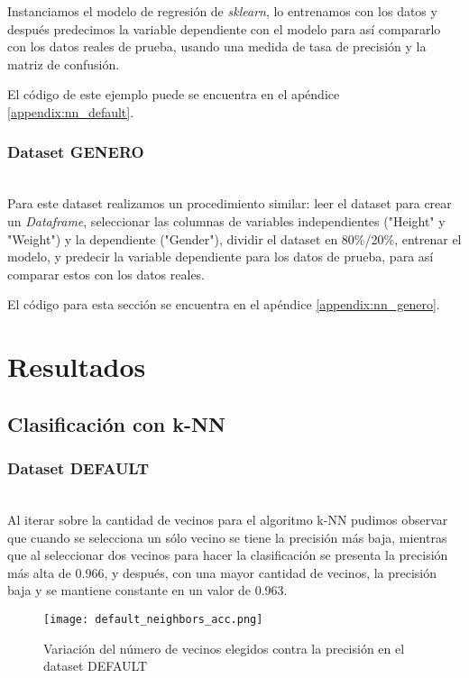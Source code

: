 \documentclass[sigconf,authorversion,nonacm]{acmart}
\begin{document}
Instanciamos el modelo de regresión de \textit{sklearn}, lo entrenamos con los datos y después predecimos la variable dependiente con el modelo para así compararlo con los datos reales de prueba, usando una medida de tasa de precisión y la matriz de confusión.

El código de este ejemplo puede se encuentra en el apéndice \ref{appendix:nn_default}.

\subsubsection{Dataset GENERO}\hfill\\
Para este dataset realizamos un procedimiento similar: leer el dataset para crear un \textit{Dataframe}, seleccionar las columnas de variables independientes ("Height" y "Weight") y la dependiente ("Gender"), dividir el dataset en 80\%/20\%, entrenar el modelo, y predecir la variable dependiente para los datos de prueba, para así comparar estos con los datos reales.

El código para esta sección se encuentra en el apéndice \ref{appendix:nn_genero}.


\section{Resultados}

\subsection{Clasificación con k-NN}

\subsubsection{Dataset DEFAULT}\hfill\\
Al iterar sobre la cantidad de vecinos para el algoritmo k-NN pudimos observar que cuando se selecciona un sólo vecino se tiene la precisión más baja, mientras que al seleccionar dos vecinos para hacer la clasificación se presenta la precisión más alta de 0.966, y después, con una mayor cantidad de vecinos, la precisión baja y se mantiene constante en un valor de 0.963.

\begin{figure}[H]
  \centering
  \texttt{[image: default\_neighbors\_acc.png]}
  \caption{Variación del número de vecinos elegidos contra la precisión en el dataset DEFAULT}
\end{figure}
\end{document}
